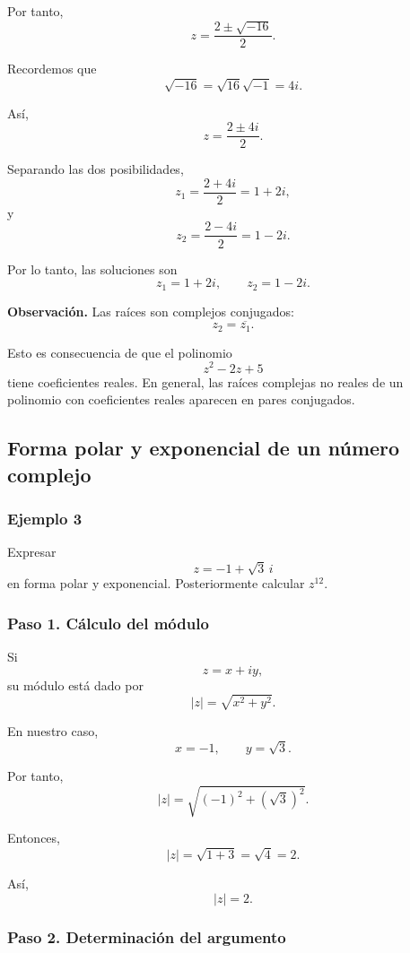 Por tanto,
\[
z
=
\frac{2\pm\sqrt{-16}}{2}.
\]

Recordemos que
\[
\sqrt{-16}
=
\sqrt{16}\sqrt{-1}
=
4i.
\]

Así,
\[
z
=
\frac{2\pm4i}{2}.
\]

Separando las dos posibilidades,
\[
z_1
=
\frac{2+4i}{2}
=
1+2i,
\]
y
\[
z_2
=
\frac{2-4i}{2}
=
1-2i.
\]

Por lo tanto, las soluciones son
\[
\boxed{
z_1=1+2i,
\qquad
z_2=1-2i
}.
\]

\medskip

\noindent
\textbf{Observación.}
Las raíces son complejos conjugados:
\[
z_2=\overline{z_1}.
\]

Esto es consecuencia de que el polinomio
\[
z^2-2z+5
\]
tiene coeficientes reales. En general, las raíces complejas no
reales de un polinomio con coeficientes reales aparecen en pares
conjugados.

\subsection{Forma polar y exponencial de un número complejo}

\subsubsection*{Ejemplo 3}

Expresar
\[
z=-1+\sqrt{3}\,i
\]
en forma polar y exponencial. Posteriormente calcular $z^{12}$.

\subsubsection*{Paso 1. Cálculo del módulo}

Si
\[
z=x+iy,
\]
su módulo está dado por
\[
|z|
=
\sqrt{x^2+y^2}.
\]

En nuestro caso,
\[
x=-1,
\qquad
y=\sqrt{3}.
\]

Por tanto,
\[
|z|
=
\sqrt{(-1)^2+(\sqrt{3})^2}.
\]

Entonces,
\[
|z|
=
\sqrt{1+3}
=
\sqrt{4}
=
2.
\]

Así,
\[
\boxed{|z|=2}.
\]

\subsubsection*{Paso 2. Determinación del argumento}


